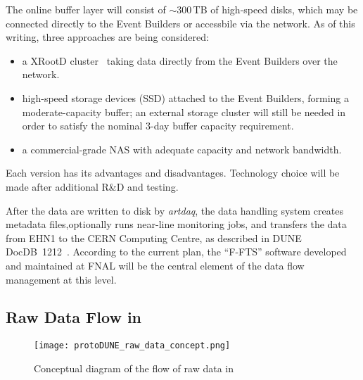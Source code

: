 The online buffer layer will consist of $\sim$300\,TB of high-speed disks, which may be connected directly to the Event Builders
or accessbile via the network.  As of this writing, three approaches are being considered:
\begin{itemize}
\item a XRootD cluster~\cite{xrootd} taking data directly from the Event Builders over the network.

\item high-speed storage devices (SSD) attached to the Event Builders, forming a moderate-capacity buffer;
an external storage cluster will still be needed in order to satisfy the nominal 3-day buffer capacity requirement.

\item a commercial-grade NAS with adequate capacity and network bandwidth.

\end{itemize}

\noindent Each version has its advantages and disadvantages. Technology choice will be made after
additional R\&D and testing.


After the data are written to disk by {\it artdaq}, the data handling
system creates metadata files,optionally  runs near-line monitoring jobs, and
transfers the data from EHN1 to the CERN Computing Centre, as
described in DUNE DocDB~1212~\cite{docdb1212}. According to the current plan,
the ``F-FTS'' software developed and maintained at FNAL will be the central element
of the data flow management at this level.


\subsection{Raw Data Flow in \pd}
\label{sec:raw_concept}
\begin{figure}[tbh]
\centering\texttt{[image: protoDUNE\_raw\_data\_concept.png]}
\caption{\label{fig:raw_concept}Conceptual diagram of the flow of raw data in \pd}
\end{figure}

